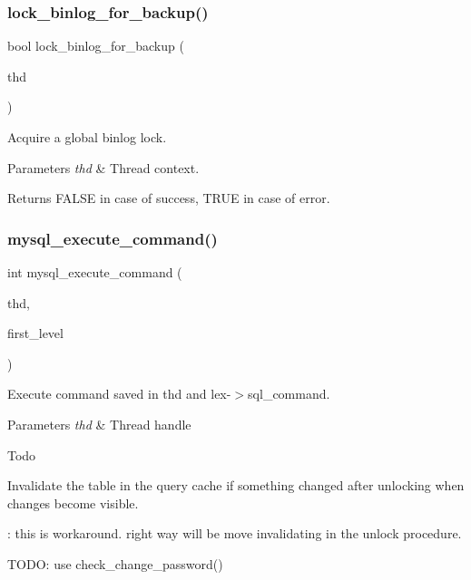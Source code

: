 \subsubsection{\texorpdfstring{lock\+\_\+binlog\+\_\+for\+\_\+backup()}{lock\_binlog\_for\_backup()}}
{\footnotesize\ttfamily bool lock\+\_\+binlog\+\_\+for\+\_\+backup (\begin{DoxyParamCaption}\item[{T\+HD $\ast$}]{thd }\end{DoxyParamCaption})}

Acquire a global binlog lock.


\begin{DoxyParams}{Parameters}
{\em thd} & Thread context.\\
\hline
\end{DoxyParams}
\begin{DoxyReturn}{Returns}
F\+A\+L\+SE in case of success, T\+R\+UE in case of error. 
\end{DoxyReturn}
\mbox{\label{group__Runtime__Environment_gac7751d9816645a7a68e879596ee7e558}} 
\subsubsection{\texorpdfstring{mysql\+\_\+execute\+\_\+command()}{mysql\_execute\_command()}}
{\footnotesize\ttfamily int mysql\+\_\+execute\+\_\+command (\begin{DoxyParamCaption}\item[{T\+HD $\ast$}]{thd,  }\item[{bool}]{first\+\_\+level }\end{DoxyParamCaption})}

Execute command saved in thd and lex-\/$>$sql\+\_\+command.


\begin{DoxyParams}{Parameters}
{\em thd} & Thread handle\\
\hline
\end{DoxyParams}
\begin{DoxyRefDesc}{Todo}
\item[\mbox{\hyperlink{todo__todo000101}{Todo}}]
\begin{DoxyItemize}
\item Invalidate the table in the query cache if something changed after unlocking when changes become visible. 
\end{DoxyItemize}

\+: this is workaround. right way will be move invalidating in the unlock procedure.
\begin{DoxyItemize}
\item T\+O\+DO\+: use check\+\_\+change\+\_\+password()
\end{DoxyItemize}\end{DoxyRefDesc}



